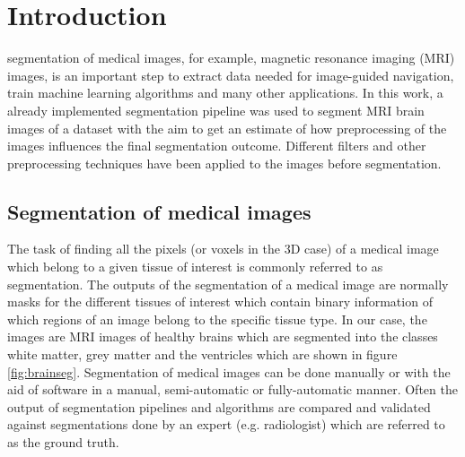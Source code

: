 \documentclass[journal]{IEEEtran}
\begin{document}
\section{Introduction}
% 
% 
% 
% 
 segmentation of medical images, for example, magnetic resonance imaging (MRI) images, is an important step to extract data needed for image-guided navigation, train machine learning algorithms and many other applications. In this work, a already implemented segmentation pipeline was used to segment MRI brain images of a dataset with the aim to get an estimate of how preprocessing of the images influences the final segmentation outcome. Different filters and other preprocessing techniques have been applied to the images before segmentation.

\subsection{Segmentation of medical images}
The task of finding all the pixels (or voxels in the 3D case) of a medical image which belong to a given tissue of interest is commonly referred to as segmentation. The outputs of the segmentation of a medical image are normally masks for the different tissues of interest which contain binary information of which regions of an image belong to the specific tissue type. In our case, the images are MRI images of healthy brains which are segmented into the classes white matter, grey matter and the ventricles which are shown in figure \ref{fig:brainseg}. Segmentation of medical images can be done manually or with the aid of software in a manual, semi-automatic or fully-automatic manner. Often the output of segmentation pipelines and algorithms are compared and validated against segmentations done by an expert (e.g. radiologist) which are referred to as the ground truth.
\end{document}
